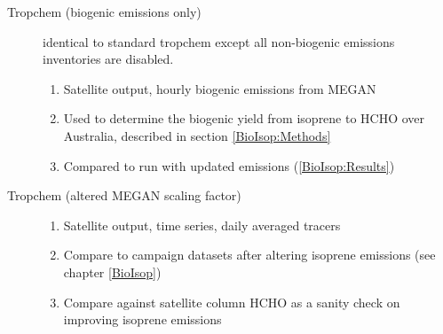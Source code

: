 \begin{description}
        \item [Tropchem (biogenic emissions only)]%
          identical to standard tropchem except all non-biogenic emissions inventories are disabled.
        \begin{enumerate}
          \item Satellite output, hourly biogenic emissions from MEGAN
          \item Used to determine the biogenic yield from isoprene to HCHO over Australia, described in section \ref{BioIsop:Methods}
          \item Compared to run with updated emissions (\ref{BioIsop:Results})
        \end{enumerate}
        
        \item [Tropchem (altered MEGAN scaling factor)]
        \begin{enumerate}
          \item Satellite output, time series, daily averaged tracers
          \item Compare to campaign datasets after altering isoprene emissions (see chapter \ref{BioIsop})
          \item Compare against satellite column HCHO as a sanity check on improving isoprene emissions
        \end{enumerate}
        
      \end{description}
    
    
    
